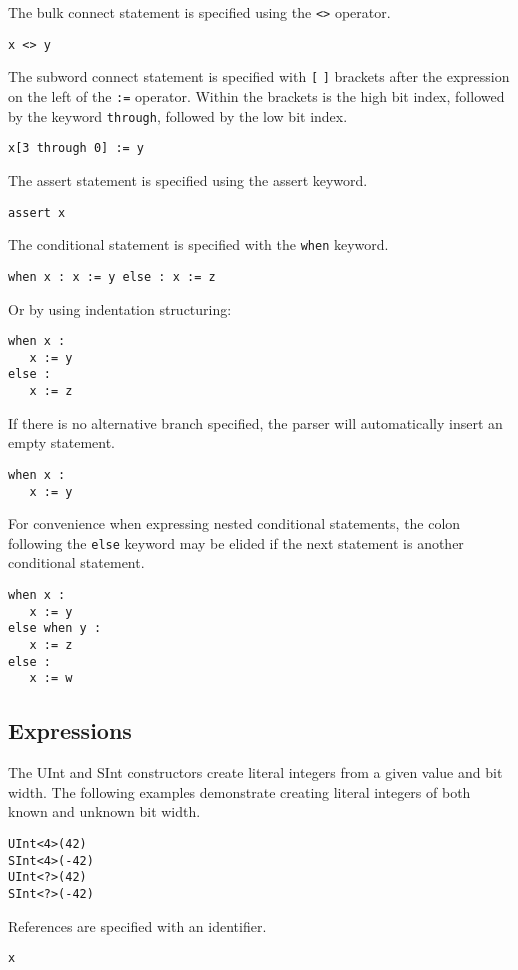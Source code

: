 \documentclass[12pt]{article}
\begin{document}
The bulk connect statement is specified using the \verb|<>| operator.
\begin{verbatim}
x <> y 
\end{verbatim}

The subword connect statement is specified with \verb|[| \verb|]| brackets after the expression on the left of the \verb|:=| operator. Within the brackets is the high bit index, followed by the keyword \verb|through|, followed by the low bit index.
\begin{verbatim}
x[3 through 0] := y 
\end{verbatim}

The assert statement is specified using the assert keyword.
\begin{verbatim}
assert x
\end{verbatim}

The conditional statement is specified with the \verb|when| keyword.
\begin{verbatim}
when x : x := y else : x := z
\end{verbatim}
Or by using indentation structuring:
\begin{verbatim}
when x :
   x := y
else :
   x := z
\end{verbatim}

If there is no alternative branch specified, the parser will automatically insert an empty statement.
\begin{verbatim}
when x :
   x := y
\end{verbatim}

For convenience when expressing nested conditional statements, the colon following the \verb|else| keyword may be elided if the next statement is another conditional statement.
\begin{verbatim}
when x :
   x := y
else when y :
   x := z
else :
   x := w
\end{verbatim}

\subsection*{Expressions}

The UInt and SInt constructors create literal integers from a given value and bit width.
The following examples demonstrate creating literal integers of both known and unknown bit width.
\begin{verbatim}
UInt<4>(42)
SInt<4>(-42)
UInt<?>(42)
SInt<?>(-42)
\end{verbatim}

References are specified with an identifier.
\begin{verbatim}
x
\end{verbatim}
\end{document}
